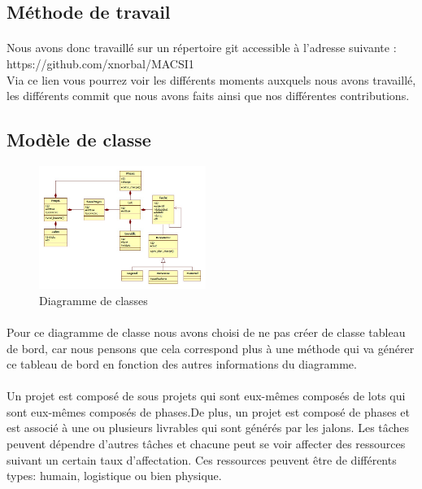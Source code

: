 \documentclass[a4paper, 12pt]{article}
\begin{document}
\subsection{Méthode de travail}
\paragraph{}Nous avons donc travaillé sur un répertoire git accessible à l'adresse suivante : \\ https://github.com/xnorbal/MACSI1  \\
Via ce lien vous pourrez voir les différents moments auxquels nous avons travaillé, les différents commit que nous avons faits ainsi que nos différentes contributions.

\subsection{Modèle de classe}

\begin{figure}[h!]
	\centering
	\includegraphics[height=4cm]{diagramme_de_classe.jpg}
	\caption{Diagramme de classes}
\end{figure}
\paragraph{}Pour ce diagramme de classe nous avons choisi de ne pas créer de classe tableau de bord, car nous pensons que cela correspond plus à une méthode qui va générer ce tableau de bord en fonction des autres informations du diagramme.
\paragraph{}Un projet est composé de sous projets qui sont eux-mêmes composés de lots qui sont eux-mêmes composés de phases.De plus, un projet est composé de phases et est associé à une ou plusieurs livrables qui sont générés par les jalons. Les tâches peuvent dépendre d'autres tâches et chacune peut se voir affecter des ressources suivant un certain taux d'affectation.  Ces ressources peuvent être de différents types: humain, logistique ou bien physique.
\end{document}
